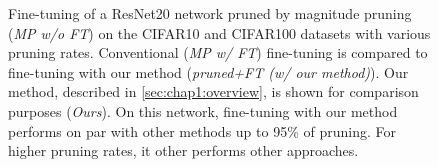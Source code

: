 \begin{figure}
  \centering
  \caption{ Fine-tuning of a ResNet20 network pruned by magnitude pruning
    (\emph{MP w/o FT}) on the CIFAR10 and CIFAR100 datasets with various pruning
    rates. Conventional (\emph{MP w/ FT}) fine-tuning is compared to fine-tuning
    with our method (\emph{pruned+FT (w/ our method)}). Our method, described in
    \cref{sec:chap1:overview}, is shown for comparison purposes (\emph{Ours}). On
    this network, fine-tuning with our method performs on par with other methods
    up to 95\% of pruning. For higher pruning rates, it other performs other
    approaches.}
  \label{fig:chap1:finetuning_impact_vgg6}
\end{figure}


